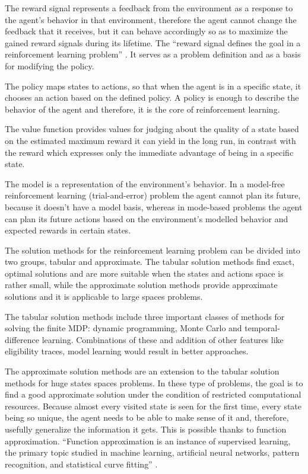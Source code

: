 The reward signal represents a feedback from the environment as a response to the agent’s behavior in that environment, therefore the agent cannot change the feedback that it receives, but it can behave accordingly so as to maximize the gained reward signals during its lifetime. The “reward signal defines the goal in a reinforcement learning problem” \cite{Sutton}. It serves as a problem definition and as a basis for modifying the policy.

The policy maps states to actions, so that when the agent is in a specific state, it chooses an action based on the defined policy. A policy is enough to describe the behavior of the agent and therefore, it is the core of reinforcement learning.

The value function provides values for judging about the quality of a state based on the estimated maximum reward it can yield in the long run, in contrast with the reward which expresses only the immediate advantage of being in a specific state.

The model is a representation of the environment’s behavior. In a model-free reinforcement learning (trial-and-error) problem the agent cannot plan its future, because it doesn’t have a model basis, whereas in mode-based problems the agent can plan its future actions based on the environment’s modelled behavior and expected rewards in certain states.

The solution methods for the reinforcement learning problem can be divided into two groups, tabular and approximate. The tabular solution methods find exact, optimal solutions and are more suitable when the states and actions space is rather small, while the approximate solution methods provide approximate solutions and it is applicable to large spaces problems.

The tabular solution methods include three important classes of methods for solving the finite MDP: dynamic programming, Monte Carlo and temporal-difference learning. Combinations of these and addition of other features like eligibility traces, model learning would result in better approaches.

The approximate solution methods are an extension to the tabular solution methods for huge states spaces problems. In these type of problems, the goal is to find a good approximate solution under the condition of restricted computational resources. Because almost every visited state is seen for the first time, every state being so unique, the agent needs to be able to make sense of it and, therefore, usefully generalize the information it gets. This is possible thanks to function approximation. “Function approximation is an instance of supervised learning, the primary topic studied in machine learning, artificial neural networks, pattern recognition, and statistical curve fitting” \cite{Sutton}.